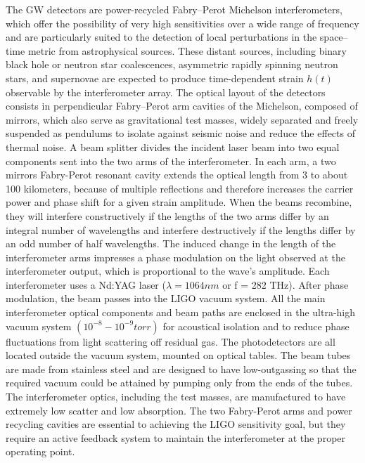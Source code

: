 \documentclass[binding=0.6cm, LaM]{sapthesis}
\begin{document}
	The GW detectors are power-recycled Fabry–Perot Michelson interferometers, 
	which offer the possibility of very high sensitivities over a wide range of frequency and 
	are particularly suited to the detection of local perturbations in the space–time metric from astrophysical sources.
	These distant sources, including binary black hole or neutron star coalescences, asymmetric rapidly spinning neutron stars, 
	and supernovae are expected to produce time-dependent strain $h(t)$ observable by the interferometer array.
	The optical layout of the detectors consists in perpendicular Fabry–Perot arm cavities of the Michelson, 
	composed of mirrors, which also serve as gravitational test masses, widely separated and 
	freely suspended as pendulums to isolate against seismic noise and reduce the effects of thermal noise.
	A beam splitter divides the incident laser beam into two equal components sent into the two arms of the interferometer. 
	In each arm, a two mirrors Fabry-Perot resonant cavity extends the optical length from 3 to about 100 kilometers, 
	because of multiple reflections and therefore increases the carrier power and phase shift for a given strain amplitude. 
	When the beams recombine, they will interfere constructively if the lengths of the two arms differ by an integral number 
	of wavelengths and interfere destructively if the lengths differ by an odd number of half wavelengths.
	The induced change in the length of the interferometer arms impresses a phase modulation on the 
	light observed at the interferometer output, which is proportional to the wave’s amplitude.
	Each interferometer uses a Nd:YAG laser  ($\lambda = 1064 nm$ or f = 282 THz).
	After phase modulation, the beam passes into the LIGO vacuum system. 
	All the main interferometer optical components and beam paths are enclosed in the ultra-high vacuum system 
	$(10^{−8} - 10^{−9} torr)$ for acoustical isolation and to reduce phase fluctuations from light scattering off residual gas. 
	The photodetectors are all located outside the vacuum system, mounted on optical tables. 
	The beam tubes are made from stainless steel and are designed to have low-outgassing 
	so that the required vacuum could be attained by pumping only from the ends of the tubes. 
	The interferometer optics, including the test masses, are manufactured to have extremely low scatter and low absorption.
	The two Fabry-Perot arms and power recycling cavities are essential to achieving the LIGO sensitivity goal, 
	but they require an active feedback system to maintain the interferometer at the proper operating point.
\end{document}
